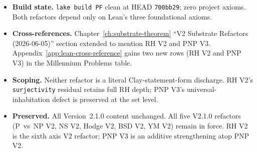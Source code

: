 \begin{itemize}
\begin{itemize}
  \item \textbf{P vs NP V3.}
  \texttt{PF.TuringEncoding.\\PNPClassSeparationCarrierV3}
  (V3 of the V2 Bool-valued carrier) replaces the V2
  \texttt{computability~:~True} placeholder with a REAL constraint
  wired through \texttt{PF.TuringEncoding.Basic.TMConfig} and
  \texttt{encodeConfig} (the manuscript Chapter~21~\S2 prime-power
  G\"odel numbering, $2^{\mathrm{state}} \cdot 3^{\mathrm{headPos}}
  \cdot \prod p_{j+1}^{\mathrm{symbol}+1}$).
  \texttt{DeterministicMachineV3} carries a new
  \texttt{encodeRun~:~Input~$\to$~TMConfig} field and a
  \texttt{computability~:~$\forall$~x,~encodeConfig~(encodeRun~x)~>~0}
  constraint (using \texttt{encodeConfig\_positive}, an axiom-free
  TMConfig~$\to$~$\mathbb{N}^+$ map);
  \texttt{NondeterministicMachineV3} mirrors on
  \texttt{(input,~certificate)} pairs. The Cook~1971 inclusion
  $P \subseteq NP$ is re-ported on V3 via
  \texttt{class\_P\_subset\_class\_NP\_V3}; the reduction analog is
  \texttt{enum\_to\_class\_separation\_bridge\_V3\_iff\_literal\_P\_neq\_NP\_V3}.
  Scoping: the TMConfig wiring closes the
  \emph{structural-shape defect} (every machine now carries a
  TM-config-valued run, not just an opaque \texttt{True}) but does NOT
  close the \emph{universal-inhabitation defect} at the set level ---
  the surviving defect localises to a SINGLE named missing axis
  (absence of a constraint LINKING \texttt{decide} to \texttt{encodeRun},
  e.g.\ ``\texttt{decide~x~=~true~$\leftrightarrow$~encodeRun~x}
  reaches an accepting TM state''), which is the V4 refactor target.
  Scoping capstone: \texttt{pnp\_carrier\_V3\_referee\_scope\_capstone}.
  \end{itemize}
\item \textbf{Build state.} \texttt{lake build PF} clean at HEAD
\texttt{700bb29}; zero project axioms. Both refactors depend only on
Lean's three foundational axioms.
\item \textbf{Cross-references.} Chapter~\ref{ch:substrate-theorem}
``V2 Substrate Refactors (2026-06-05)'' section extended to mention
RH V2 and PNP V3. Appendix~\ref{app:lean-cross-reference} gains two
new rows (RH V2 and PNP V3) in the Millennium Problems table.
\item \textbf{Scoping.} Neither refactor is a literal
Clay-statement-form discharge. RH V2's \texttt{surjectivity} residual
retains full RH depth; PNP V3's universal-inhabitation defect is
preserved at the set level.
\item \textbf{Preserved.} All Version~2.1.0 content unchanged. All
five V2.1.0 refactors (P~vs~NP V2, NS V2, Hodge V2, BSD V2, YM V2)
remain in force. RH V2 is the sixth axis V2 refactor; PNP V3 is an
additive strengthening atop PNP V2.
\end{itemize}

